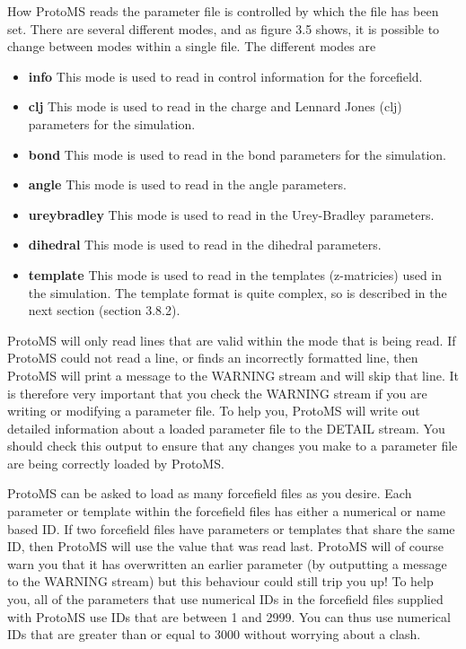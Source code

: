 \documentclass[letterpaper,10pt,english]{sphinxmanual}
\begin{document}
How ProtoMS reads the parameter file is controlled by which  the file has been set. There are several different modes, and as figure 3.5 shows, it is possible to change between modes within a single file. The different modes are
\begin{itemize}
\item {} 
\textbf{info} This mode is used to read in control information for the forcefield.

\item {} 
\textbf{clj} This mode is used to read in the charge and Lennard Jones (clj) parameters for the simulation.

\item {} 
\textbf{bond} This mode is used to read in the bond parameters for the simulation.

\item {} 
\textbf{angle} This mode is used to read in the angle parameters.

\item {} 
\textbf{ureybradley} This mode is used to read in the Urey-Bradley parameters.

\item {} 
\textbf{dihedral} This mode is used to read in the dihedral parameters.

\item {} 
\textbf{template} This mode is used to read in the templates (z-matricies) used in the simulation. The template format is quite complex, so is described in the next section (section 3.8.2).

\end{itemize}

ProtoMS will only read lines that are valid within the mode that is being read. If ProtoMS could not read a line, or finds an incorrectly formatted line, then ProtoMS will print a message to the WARNING stream and will skip that line. It is therefore very important that you check the WARNING stream if you are writing or modifying a parameter file. To help you, ProtoMS will write out detailed information about a loaded parameter file to the DETAIL stream. You should check this output to ensure that any changes you make to a parameter file are being
correctly loaded by ProtoMS.

ProtoMS can be asked to load as many forcefield files as you desire. Each parameter or template within the forcefield files has either a numerical or name based ID. If two forcefield files have parameters or templates that share the same ID, then ProtoMS will use the value that was read last. ProtoMS will of course warn you that it has overwritten an earlier parameter (by outputting a message to the WARNING stream) but this behaviour could still trip you up! To help you, all of the parameters that use numerical IDs in the forcefield files supplied with ProtoMS use IDs that are between 1 and 2999. You can thus use numerical IDs that are greater than or equal to 3000 without worrying about a clash.
\end{document}
